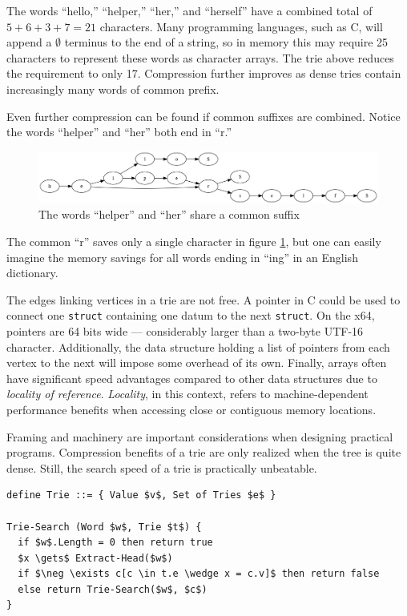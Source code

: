 \documentclass{book}
\begin{document}
The words ``hello,'' ``helper,'' ``her,'' and ``herself'' have a combined total of $5+6+3+7=21$ characters. Many programming languages, such as C, will append a $\emptyset$ terminus to the end of a string, so in memory this may require 25 characters to represent these words as character arrays. The trie above reduces the requirement to only 17. Compression further improves as dense tries contain increasingly many words of common prefix.

Even further compression can be found if common suffixes are combined. Notice the words ``helper'' and ``her'' both end in ``r.''

\begin{figure}[ht]
\centering
\includegraphics[width=5in]{ch-trie/hello_helper_her_herself_common_suffix}
\caption{The words ``helper'' and ``her'' share a common suffix}
\label{h4c}
\end{figure}

The common ``r'' saves only a single character in figure \ref{h4c}, but one can easily imagine the memory savings for all words ending in ``ing'' in an English dictionary.

The edges linking vertices in a trie are not free. A pointer in C could be used to connect one \texttt{struct} containing one datum to the next \texttt{struct}. On the x64, pointers are 64 bits wide --- considerably larger than a two-byte UTF-16 character. Additionally, the data structure holding a list of pointers from each vertex to the next will impose some overhead of its own. Finally, arrays often have significant speed advantages compared to other data structures due to \textit{locality of reference}. \textit{Locality}, in this context, refers to machine-dependent performance benefits when accessing close or contiguous memory locations.

Framing and machinery are important considerations when designing practical programs. Compression benefits of a trie are only realized when the tree is quite dense. Still, the search speed of a trie is practically unbeatable.

\begin{lstlisting}[mathescape]
define Trie ::= { Value $v$, Set of Tries $e$ }

Trie-Search (Word $w$, Trie $t$) {
  if $w$.Length = 0 then return true
  $x \gets$ Extract-Head($w$)
  if $\neg \exists c[c \in t.e \wedge x = c.v]$ then return false
  else return Trie-Search($w$, $c$)
}
\end{lstlisting}
\end{document}

